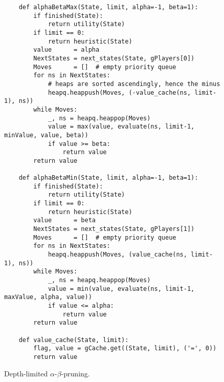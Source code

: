 \begin{figure}[!ht]
\centering
\begin{verbatim}
    def alphaBetaMax(State, limit, alpha=-1, beta=1):
        if finished(State):
            return utility(State)
        if limit == 0:
            return heuristic(State)
        value      = alpha
        NextStates = next_states(State, gPlayers[0])
        Moves      = []  # empty priority queue
        for ns in NextStates:
            # heaps are sorted ascendingly, hence the minus
            heapq.heappush(Moves, (-value_cache(ns, limit-1), ns))
        while Moves:
            _, ns = heapq.heappop(Moves)
            value = max(value, evaluate(ns, limit-1, minValue, value, beta))
            if value >= beta:
                return value
        return value    

    def alphaBetaMin(State, limit, alpha=-1, beta=1):
        if finished(State):
            return utility(State)
        if limit == 0:
            return heuristic(State)
        value      = beta
        NextStates = next_states(State, gPlayers[1])
        Moves      = []  # empty priority queue
        for ns in NextStates:
            heapq.heappush(Moves, (value_cache(ns, limit-1), ns))
        while Moves:
            _, ns = heapq.heappop(Moves)
            value = min(value, evaluate(ns, limit-1, maxValue, alpha, value))
            if value <= alpha:
                return value
        return value

    def value_cache(State, limit):
        flag, value = gCache.get((State, limit), ('=', 0))
        return value
\end{verbatim}
\caption{Depth-limited $\alpha$-$\beta$-pruning.}
\label{fig:Game.ipynb}
\end{figure}
\FloatBarrier


